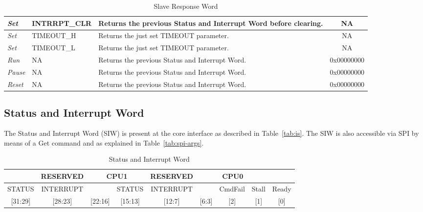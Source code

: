 \documentclass{rep}
\theoremstyle{plain}
\begin{document}
\begin{table}[H]
\begin{center}
\begin{tabular}{|l|l|p{7cm}|c|}
      \rowcolor{iob-blue}
      \textit{Set} & INTRRPT\_CLR & Returns the previous Status and Interrupt
      Word before clearing. & NA\\ \hline

      \textit{Set} & TIMEOUT\_H & Returns the just set TIMEOUT parameter.
      & NA\\ \hline \hline \hline

      \rowcolor{iob-blue}
      \textit{Set} & TIMEOUT\_L & Returns the just set TIMEOUT parameter.
      & NA\\ \hline \hline \hline

      \textit{Run} & NA & Returns the previous Status and Interrupt Word. &
      0x00000000\\ \hline

      \rowcolor{iob-blue}
      \textit{Pause} & NA & Returns the previous Status and
      Interrupt Word. & 0x00000000\\ \hline

      \textit{Reset} & NA & Returns the previous Status and Interrupt Word. &
      0x00000000\\ \hline

    \end{tabular}
    \caption{Slave Response Word}
    \label{tab:spi-resp}
  \end{center}
\end{table}
\clearpage

\subsection{Status and Interrupt Word}

The Status and Interrupt Word (SIW) is present at the core interface
as described in Table~\ref{tab:is}. The SIW is also accessible via SPI
by means of a Get command and as explained in
Table~\ref{tab:spi-args}.

\begin{table}[H]
  \begin{center}
    \begin{tabular}{|c|c|c|c|c|c|c|c|c|}
      \hline
      \hline
      \rowcolor{iob-green}
      \multicolumn{2}{|c|}{\textbf{CPU2}} & \textbf{RESERVED} & \multicolumn{2}{|c|}{\textbf{CPU1}} & \textbf{RESERVED} &  \multicolumn{3}{|c|}{\textbf{CPU0}}   \\
      \hline
      \hline
      STATUS  & INTERRUPT &         & STATUS   & INTERRUPT &      & CmdFail          & Stall    &  Ready \\
      {[31:29]} & {[28:23]}   & \multirow{-2}{*}{[22:16]} & [15:13]  & [12:7]    & \multirow{-2}{*}{[6:3]}&  [2]    & [1]       &  [0]   \\
      \hline
      \hline
    \end{tabular}
    \caption{Status and Interrupt Word}
    \label{tab:si}
  \end{center}
\end{table}
\end{document}
